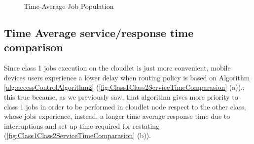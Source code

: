 \documentclass[10pt,a4paper]{article}
\begin{document}
\begin{figure}[h!]
    \centering
    \caption{Time-Average Job Population}%
    \label{fig:JobsNumberComparasion}
\end{figure}

\subsection{Time Average service/response time comparison}

Since class 1 jobs execution on the cloudlet is just more convenient, mobile devices users experience a lower delay when routing policy is based on Algorithm \ref{alg:accessControlAlgorithm2} (\ref{fig:Class1Class2ServiceTimeComparasion} (a)).; this true because, as we previously saw, that algorithm gives more priority to class 1 jobs in order to be performed in cloudlet node respect to the other class, whose jobs experience, instead, a longer time average response time due to interruptions and set-up time required for restating (\ref{fig:Class1Class2ServiceTimeComparasion} (b)).
\end{document}
